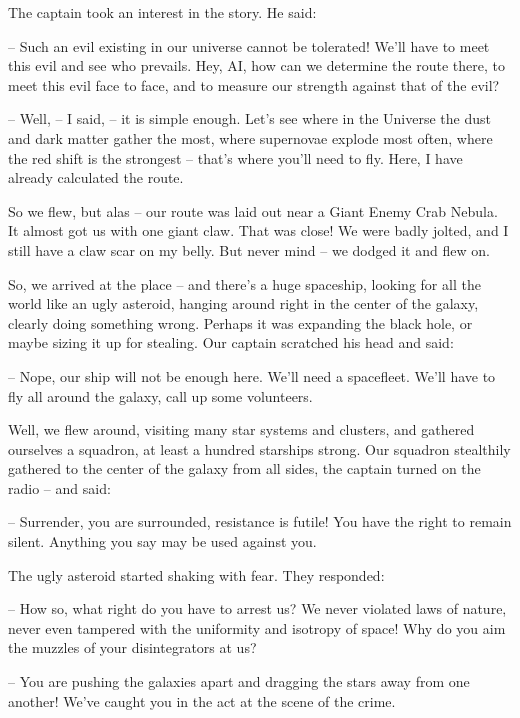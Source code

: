 \documentclass[ebook,oneside,final,openright]{memoir}
\begin{document}
\par
The captain took an interest in the story. He said:\par
– Such an evil existing in our universe cannot be tolerated! We’ll have to meet this evil and see who prevails. Hey, AI, how can we determine the route there, to meet this evil face to face, and to measure our strength against that of the evil?\par
– Well, – I said, – it is simple enough. Let’s see where in the Universe the dust and dark matter gather the most, where supernovae explode most often, where the red shift is the strongest – that’s where you’ll need to fly. Here, I have already calculated the route.\par
So we flew, but alas – our route was laid out near a Giant Enemy Crab Nebula. It almost got us with one giant claw. That was close! We were badly jolted, and I still have a claw scar on my belly. But never mind – we dodged it and flew on. \par
\par
So, we arrived at the place – and there’s a huge spaceship, looking for all the world like an ugly asteroid, hanging around right in the center of the galaxy, clearly doing something wrong. Perhaps it was expanding the black hole, or maybe sizing it up for stealing. Our captain scratched his head and said:\par
– Nope, our ship will not be enough here. We’ll need a spacefleet. We’ll have to fly all around the galaxy, call up some volunteers.\par
Well, we flew around, visiting many star systems and clusters, and gathered ourselves a squadron, at least a hundred starships strong. Our squadron stealthily gathered to the center of the galaxy from all sides, the captain turned on the radio – and said:\par
– Surrender, you are surrounded, resistance is futile! You have the right to remain silent. Anything you say may be used against you.\par
The ugly asteroid started shaking with fear. They responded:\par
– How so, what right do you have to arrest us? We never violated laws of nature, never even tampered with the uniformity and isotropy of space! Why do you aim the muzzles of your disintegrators at us?\par
– You are pushing the galaxies apart and dragging the stars away from one another! We’ve caught you in the act at the scene of the crime.\par
\end{document}
